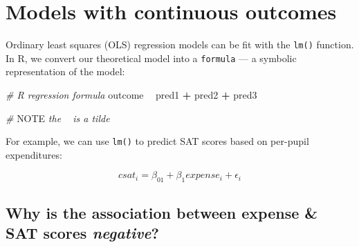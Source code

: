 \documentclass[]{book}
\newenvironment{Shaded}{\begin{snugshade}}{\end{snugshade}}
\newcommand{\KeywordTok}[1]{\textcolor[rgb]{0.13,0.29,0.53}{\textbf{#1}}}
\newcommand{\DataTypeTok}[1]{\textcolor[rgb]{0.13,0.29,0.53}{#1}}
\newcommand{\DecValTok}[1]{\textcolor[rgb]{0.00,0.00,0.81}{#1}}
\newcommand{\StringTok}[1]{\textcolor[rgb]{0.31,0.60,0.02}{#1}}
\newcommand{\CommentTok}[1]{\textcolor[rgb]{0.56,0.35,0.01}{\textit{#1}}}
\newcommand{\OperatorTok}[1]{\textcolor[rgb]{0.81,0.36,0.00}{\textbf{#1}}}
\newcommand{\AlertTok}[1]{\textcolor[rgb]{0.94,0.16,0.16}{#1}}
\newcommand{\NormalTok}[1]{#1}
\begin{document}
\section{Models with continuous
outcomes}\label{models-with-continuous-outcomes}

Ordinary least squares (OLS) regression models can be fit with the
\texttt{lm()} function. In R, we convert our theoretical model into a
\texttt{formula} --- a symbolic representation of the model:

\begin{Shaded}
\begin{Highlighting}[]
\CommentTok{# R regression formula}
\NormalTok{outcome }\OperatorTok{~}\StringTok{ }\NormalTok{pred1 }\OperatorTok{+}\StringTok{ }\NormalTok{pred2 }\OperatorTok{+}\StringTok{ }\NormalTok{pred3}

\CommentTok{# }\AlertTok{NOTE}\CommentTok{ the ~ is a tilde}
\end{Highlighting}
\end{Shaded}

For example, we can use \texttt{lm()} to predict SAT scores based on
per-pupil expenditures:

\[
csat_i = \beta_01 + \beta_1expense_i + \epsilon_i
\]

\begin{Shaded}
\end{Shaded}

\subsection{\texorpdfstring{Why is the association between expense \&
SAT scores
\emph{negative}?}{Why is the association between expense \& SAT scores negative?}}\label{why-is-the-association-between-expense-sat-scores-negative}
\end{document}
